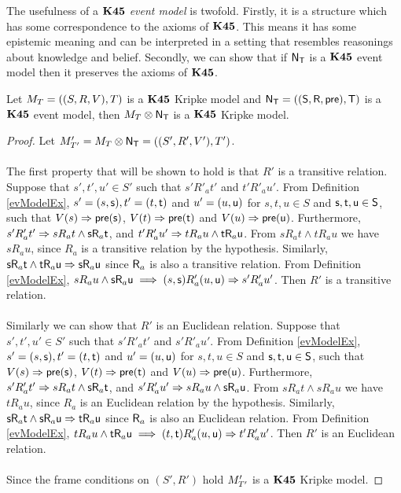 The usefulness of a {\em $\bf K45$ event model} is twofold.
Firstly, it is a structure which has some correspondence to the axioms of $\bf K45$.
This means it has some epistemic meaning and can be interpreted in a setting that resembles
reasonings about knowledge and belief.
Secondly, we can show that if $\mathrm{\mathsf{N}}_\mathrm{\mathsf{T}}$ is a $\bf K45$ event model then it preserves the axioms of
$\bf K45$.

\begin{lemma} \label{lemma:k45preserved}
	Let $M_T = ((S,R,V),T)$ is a $\bf K45$ Kripke model and $\mathrm{\mathsf{N}}_\mathrm{\mathsf{T}} = ((\mathrm{\mathsf{S}},\mathrm{\mathsf{R}},\mathrm{\mathsf{pre}}),\mathrm{\mathsf{T}})$ is a $\bf K45$ event model, then
	$M_T \otimes \mathrm{\mathsf{N}}_\mathrm{\mathsf{T}}$ is a $\bf K45$ Kripke model.
\end{lemma}
\begin{proof}
	Let $M'_{T'} = M_T \otimes \mathrm{\mathsf{N}}_\mathrm{\mathsf{T}} = ((S',R',V'),T')$.\\
	\\
	The first property that will be shown to hold is that $R'$ is a transitive relation.
	Suppose that $s',t',u' \in S'$ such that $s' R'_a t'$ and $t' R'_a u'$.
	From Definition \ref{evModelEx}, $s' = (s,\mathrm{\mathsf{s}}), t' = (t,\mathrm{\mathsf{t}})$ and $u' = (u,\mathrm{\mathsf{u}})$ for $s,t,u \in
	S$ and $\mathrm{\mathsf{s}},\mathrm{\mathsf{t}},\mathrm{\mathsf{u}} \in \mathrm{\mathsf{S}}$, such that $V(s) \Rightarrow \mathrm{\mathsf{pre}}(\mathrm{\mathsf{s}})$, $V(t) \Rightarrow
	\mathrm{\mathsf{pre}}(\mathrm{\mathsf{t}})$ and $V(u) \Rightarrow \mathrm{\mathsf{pre}}(\mathrm{\mathsf{u}})$.
	Furthermore, $s' R'_a t' \Rightarrow s R_a t \land \mathrm{\mathsf{s}} \mathrm{\mathsf{R}}_a \mathrm{\mathsf{t}}$, and $t' R'_a u' \Rightarrow
	t R_a u \land \mathrm{\mathsf{t}} \mathrm{\mathsf{R}}_a \mathrm{\mathsf{u}}$.
	From $s R_a t \land t R_a u$ we have $s R_a u$, since $R_a$ is a transitive relation by the
	hypothesis.
	Similarly, $\mathrm{\mathsf{s}} \mathrm{\mathsf{R}}_a \mathrm{\mathsf{t}} \land \mathrm{\mathsf{t}} \mathrm{\mathsf{R}}_a \mathrm{\mathsf{u}} \Rightarrow \mathrm{\mathsf{s}} \mathrm{\mathsf{R}}_a \mathrm{\mathsf{u}}$ since $\mathrm{\mathsf{R}}_a$
	is also a transitive relation.
	From Definition \ref{evModelEx}, $s R_a u \land \mathrm{\mathsf{s}} \mathrm{\mathsf{R}}_a \mathrm{\mathsf{u}} \implies (s,\mathrm{\mathsf{s}}) R'_a (u,\mathrm{\mathsf{u}})
	\Rightarrow s' R'_a u'$.
	Then $R'$ is a transitive relation.\\
	\\
	Similarly we can show that $R'$ is an Euclidean relation.
	Suppose that $s',t',u' \in S'$ such that $s' R'_a t'$ and $s' R'_a u'$.
	From Definition \ref{evModelEx}, $s' = (s,\mathrm{\mathsf{s}}), t' = (t,\mathrm{\mathsf{t}})$ and $u' = (u,\mathrm{\mathsf{u}})$ for $s,t,u \in
	S$ and $\mathrm{\mathsf{s}},\mathrm{\mathsf{t}},\mathrm{\mathsf{u}} \in \mathrm{\mathsf{S}}$, such that $V(s) \Rightarrow \mathrm{\mathsf{pre}}(\mathrm{\mathsf{s}})$, $V(t) \Rightarrow
	\mathrm{\mathsf{pre}}(\mathrm{\mathsf{t}})$ and $V(u) \Rightarrow \mathrm{\mathsf{pre}}(\mathrm{\mathsf{u}})$.
	Furthermore, $s' R'_a t' \Rightarrow s R_a t \land \mathrm{\mathsf{s}} \mathrm{\mathsf{R}}_a \mathrm{\mathsf{t}}$, and $s' R'_a u' \Rightarrow
	s R_a u \land \mathrm{\mathsf{s}} \mathrm{\mathsf{R}}_a \mathrm{\mathsf{u}}$.
	From $s R_a t \land s R_a u$ we have $t R_a u$, since $R_a$ is an Euclidean relation by the
	hypothesis.
	Similarly, $\mathrm{\mathsf{s}} \mathrm{\mathsf{R}}_a \mathrm{\mathsf{t}} \land \mathrm{\mathsf{s}} \mathrm{\mathsf{R}}_a \mathrm{\mathsf{u}} \Rightarrow \mathrm{\mathsf{t}} \mathrm{\mathsf{R}}_a \mathrm{\mathsf{u}}$ since $\mathrm{\mathsf{R}}_a$
	is also an Euclidean relation.
	From Definition \ref{evModelEx}, $t R_a u \land \mathrm{\mathsf{t}} \mathrm{\mathsf{R}}_a \mathrm{\mathsf{u}} \implies (t,\mathrm{\mathsf{t}}) R'_a (u,\mathrm{\mathsf{u}})
	\Rightarrow t' R'_a u'$.
	Then $R'$ is an Euclidean relation.\\
	\\
	Since the frame conditions on $(S',R')$ hold $M'_{T'}$ is a $\bf K45$ Kripke model.
\end{proof}

